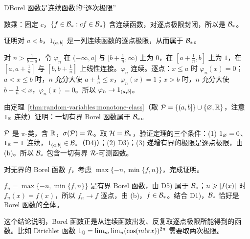 \begin{probleme}{D}{Borel 函数是连续函数的“逐次极限”}
\begin{questions}
\begin{solution}
数乘：固定 $c$，$\{f\in\mathcal{B}_\ast:cf\in\mathcal{B}_\ast\}$ 含连续函数，对逐点极限封闭，所以是 $\mathcal{B}_\ast$。
\end{solution}
\item 证明对 $a<b$，$1_{(a,b]}$ 是一列连续函数的逐点极限，从而属于 $\mathcal{B}_\ast$。
\begin{solution}
对 $n>\frac1{b-a}$，令 $\varphi_n$ 在 $(-\infty,a]$ 与 $[b+\frac1n,\infty)$ 上为 $0$，在 $[a+\frac1n,b]$ 上为 $1$，在 $[a,a+\frac1n]$ 与 $[b,b+\frac1n]$ 上线性连接。$\varphi_n$ 连续。逐点：$x\leqslant a$ 时 $\varphi_n(x)=0$；$a<x\leqslant b$ 时，$n$ 充分大使 $a+\frac1n\leqslant x$，$\varphi_n(x)=1$；$x>b$ 时，$n$ 充分大使 $b+\frac1n<x$，$\varphi_n(x)=0$。所以 $\varphi_n\to1_{(a,b]}$。
\end{solution}
\item 由定理~\ref{thm:random-variables:monotone-class}（取 $\mathcal{P}=\{(a,b]\}\cup\{\varnothing,\mathbb{R}\}$，注意 $1_{\mathbb{R}}$ 连续）证明：一切有界 Borel 函数属于 $\mathcal{B}_\ast$。
\begin{solution}
$\mathcal{P}$ 是 $\pi$-类，含 $\mathbb{R}$，$\sigma(\mathcal{P})=\mathcal{R}$。取 $\mathcal{H}=\mathcal{B}_\ast$，验证定理的三个条件：(1) $1_\varnothing=0$、$1_{\mathbb{R}}=1$ 连续，$1_{(a,b]}\in\mathcal{B}_\ast$（D4)）；(2) D3)；(3) 递增有界的极限是逐点极限，由 (b)。所以 $\mathcal{B}_\ast$ 包含一切有界 $\mathcal{R}$-可测函数。
\end{solution}
\item 对无界的 Borel 函数 $f$，考虑 $\max\{-n,\min\{f,n\}\}$，完成证明。
\begin{solution}
$f_n=\max\{-n,\min\{f,n\}\}$ 是有界 Borel 函数，由 D5) 属于 $\mathcal{B}_\ast$；$n\geqslant\lvert f(x)\rvert$ 时 $f_n(x)=f(x)$，所以 $f_n\to f$ 逐点，由 (b)，$f\in\mathcal{B}_\ast$。结合 D1)，$\mathcal{B}_\ast$ 恰好是 Borel 函数的全体。

这个结论说明，Borel 函数正是从连续函数出发、反复取逐点极限所能得到的函数。比如 Dirichlet 函数 $1_{\mathbb{Q}}=\lim_m\lim_n(\cos(m!\pi x))^{2n}$ 需要取两次极限。
\end{solution}
\end{questions}
\end{probleme}

\thinkingpart

